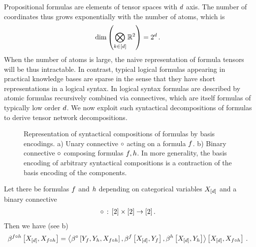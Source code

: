 Propositional formulas are elements of tensor spaces with $d$ axis.
The number of coordinates thus grows exponentially with the number of atoms, which is
\begin{align*}
    \mathrm{dim}\left(\bigotimes_{k\in[d]}\mathbb{R}^2\right) = 2^{d} \, .
\end{align*}
When the number of atoms is large, the naive representation of formula tensors will be thus intractable.
In contrast, typical logical formulas appearing in practical knowledge bases are sparse in the sense that they have short representations in a logical syntax.
In logical syntax formulas are described by atomic formulas recursively combined via connectives, which are itself formulas of typically low order $d$.
We now exploit such syntactical decompositions of formulas to derive tensor network decompositions.

\begin{figure}[t]
    \begin{center}
        
    \end{center}
    \caption{Representation of syntactical compositions of formulas by basis encodings.
    a) Unary connective $\circ$ acting on a formula $f$.
    b) Binary connective $\circ$ composing formulas $f, h$. %
    In more generality, the basis encoding of arbitrary syntactical compositions is a contraction of the basis encoding of the components.
    }
    \label{fig:unaryBinaryComposition}
\end{figure}

Let there be formulas $f$ and $h$ depending on categorical variables $X_{[d]}$ and a binary connective
\begin{align*}
    \circ \,:\, [2]\times[2] \rightarrow[2] \, .
\end{align*}
Then we have (see b)
\begin{align*}
    \beta^{f\circ h}\left[X_{[d]},X_{f\circ h}\right]
    = \left\langle 
        \beta^{\circ}\left[Y_{f},Y_{h},X_{f\circ h}\right],
        \beta^{f}\left[X_{[d]},Y_{f}\right],
        \beta^{h}\left[X_{[d]},Y_{h}\right]
    \right\rangle \left[ 
        X_{[d]},X_{f\circ h}
     \right] \, .
\end{align*}


